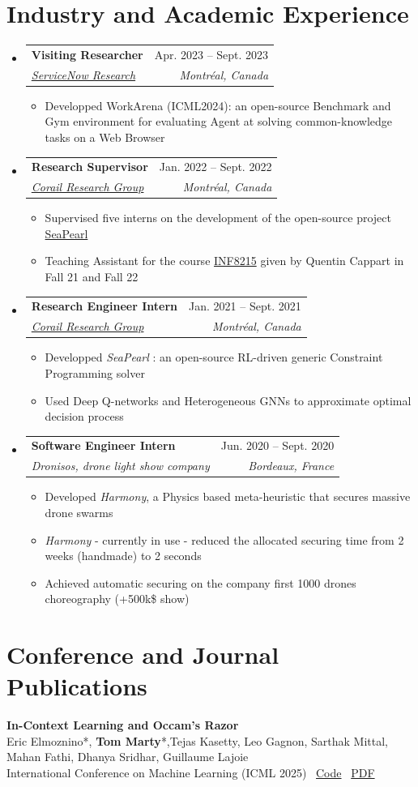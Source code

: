 \documentclass[letterpaper,11pt]{article}
\makeatletter
\newcommand{\resumeItem}[1]{
  \item\small{
    {#1 \vspace{-2pt}}
  }
}
\newcommand{\resumeSubheading}[4]{
  \vspace{-2pt}\item
    \begin{tabular*}{0.97\textwidth}[t]{l@{\extracolsep{\fill}}r}
      \textbf{#1} & #2 \\
      \textit{\small#3} & \textit{\small #4} \\
    \end{tabular*}\vspace{-7pt}
}
\newcommand{\resumeSubHeadingListStart}{\begin{itemize}[leftmargin=0.15in, label={}]}
\newcommand{\resumeSubHeadingListEnd}{\end{itemize}}
\newcommand{\resumeItemListStart}{\begin{itemize}}
\newcommand{\resumeItemListEnd}{\end{itemize}\vspace{-5pt}}
\makeatother
\begin{document}
\section{Industry and Academic Experience}
  \resumeSubHeadingListStart
      \resumeSubheading
      {Visiting Researcher}{Apr. 2023 -- Sept. 2023}
      {\href{https://corail-research.github.io/}{ServiceNow Research}}{Montréal, Canada}
    \resumeItemListStart
        \resumeItem{Developped WorkArena (ICML2024): an open-source Benchmark and Gym environment for evaluating Agent at solving common-knowledge tasks on a Web Browser}
      \resumeItemListEnd
      \resumeSubheading
      {Research Supervisor}{Jan. 2022 -- Sept. 2022}
      {\href{https://corail-research.github.io/}{Corail Research Group}}{Montréal, Canada}
    \resumeItemListStart
        \resumeItem{Supervised five interns on the development of the open-source project \href{https://github.com/corail-research/SeaPearl.jl}{SeaPearl}}
        \resumeItem{Teaching Assistant for the course \href{https://www.polymtl.ca/programmes/cours/intelligence-artif-methodes-et-algorithmes}{INF8215} given by Quentin Cappart in Fall 21 and Fall 22 }
      \resumeItemListEnd
    \resumeSubheading
      {Research Engineer Intern}{Jan. 2021 -- Sept. 2021}
      {\href{https://corail-research.github.io/}{Corail Research Group}}{Montréal, Canada}
    \resumeItemListStart
        \resumeItem{Developped {\textit{SeaPearl}} : an open-source RL-driven generic Constraint Programming solver}
        \resumeItem{Used Deep Q-networks and Heterogeneous GNNs to approximate optimal decision process}
    \resumeItemListEnd
    \resumeSubheading
      {Software Engineer Intern}{Jun. 2020 -- Sept. 2020}
      {Dronisos, drone light show company}{Bordeaux, France}
      \resumeItemListStart
        \resumeItem{Developed \textit{Harmony}, a Physics based meta-heuristic that secures massive drone swarms }
                \resumeItem{\textit{Harmony} - currently in use - reduced the allocated securing time from 2 weeks (handmade) to 2 seconds}
        \resumeItem{Achieved automatic securing on the company first 1000 drones choreography (+500k\$ show)}
      \resumeItemListEnd
    
  \resumeSubHeadingListEnd


\section{Conference and Journal Publications}
\begin{tcolorbox}[enhanced, rounded corners, colback=white, colframe=black!10!white, boxrule=0.5mm, left=10pt, right=10pt, top=6pt, bottom=3pt]
    \textbf{In-Context Learning and Occam's Razor} \\
    Eric Elmoznino*, \textbf{Tom Marty}*,Tejas Kasetty, Leo Gagnon, Sarthak Mittal, Mahan Fathi, Dhanya Sridhar, Guillaume Lajoie \\
    International Conference on Machine Learning (ICML 2025)  \hfill  \faCode  \, \href{https://github.com/3rdCore/PrequentialCode}{Code} \quad
    \faFilePdf \, \href{https://arxiv.org/abs/2410.14086}{PDF}
\end{tcolorbox}
\end{document}
